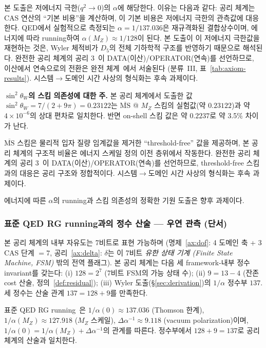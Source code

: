 \documentclass[entropy,article,submit,pdftex,oneauthor]{Definitions/mdpi}
\begin{document}
본 도출은 저에너지 극한($q^2 \to 0$)의 $\alpha$에 해당한다. 이유는 다음과 같다: 공리 체계는 CAS 연산의 ``기본 비용''을 계산하며, 이 기본 비용은 저에너지 극한의 관측값에 대응한다. QED에서 실험적으로 측정되는 $\alpha = 1/137.036$은 재규격화된 결합상수이며, 에너지에 따라 running하여 $\alpha(M_Z) \approx 1/128$이 된다. 본 도출이 이 저에너지 극한값을 재현하는 것은, Wyler 체적비가 $D_5$의 전체 기하학적 구조를 반영하기 때문으로 해석된다. 완전한 공리 체계의 공리 3~\cite{han2026}이 DATA(이산)/OPERATOR(연속)를 선언하므로, 이산에서 연속으로의 전환은 완전 체계~\cite{han2026}에서 서술된다 (분류~III, 표~\ref{tab:axiom-results}). 시스템$\to$도메인 시간 사상의 형식화는 후속 과제이다.

\textbf{$\sin^2\theta_W$의 스킴 의존성에 대한 주.} 본 공리 체계에서 도출한 값 $\sin^2\theta_W = 7/(2+9\pi) = 0.23122$는 $\overline{\mathrm{MS}}$ @ $M_Z$ 스킴의 실험값(약 $0.23122$)과 약 $4 \times 10^{-6}$의 상대 편차로 일치한다. 반면 on-shell 스킴 값은 약 $0.2237$로 약 3.5\% 차이가 난다.

$\overline{\mathrm{MS}}$ 스킴은 물리적 입자 질량 임계값을 제거한 ``threshold-free'' 값을 제공하며, 본 공리 체계의 구조적 비율은 에너지 스케일 정의 이전 층위에서 작동한다. 완전한 공리 체계의 공리 3~\cite{han2026}이 DATA(이산)/OPERATOR(연속)를 선언하므로, threshold-free 스킴과의 대응은 공리 구조와 정합적이다. 시스템$\to$도메인 시간 사상의 형식화는 후속 과제이다.

에너지에 따른 $\alpha$의 running과 스킴 의존성의 정확한 기원 도출은 향후 과제이다.

\subsubsection{표준 QED RG running과의 정수 산술 — 우연 관측 (단서)}

본 공리 체계의 내부 자유도는 7비트로 표현 가능하며 (명제~\ref{ax:dof}: 4 도메인 축 + 3 CAS 단계 $= 7$, 공리~\ref{ax:delta}: $\delta$는 이 7비트 \emph{유한 상태 기계 (Finite State Machine, FSM)} 밖의 전역 플래그). 본 공리 체계는 다음 세 framework-내부 정수 invariant를 갖는다: (i) $128 = 2^7$ (7비트 FSM의 가능 상태 수); (ii) $9 = 13 - 4$ (잔존 cost 산술, 정의~\ref{def:residual}); (iii) Wyler 도출(\S\ref{sec:derivation})의 $1/\alpha$ 정수부 $137$. 세 정수는 산술 관계 $137 = 128 + 9$를 만족한다.

표준 QED RG running~\cite{pdg2024}은 $1/\alpha(0) \approx 137.036$ (Thomson 한계), $1/\alpha(M_Z) \approx 127.918$ ($M_Z$ 스케일), $\Delta\alpha^{-1} \approx 9.118$ (vacuum polarization)이며, $1/\alpha(0) = 1/\alpha(M_Z) + \Delta\alpha^{-1}$의 관계를 따른다. 정수부에서 $128 + 9 = 137$로 공리 체계의 산술과 일치한다.
\end{document}
